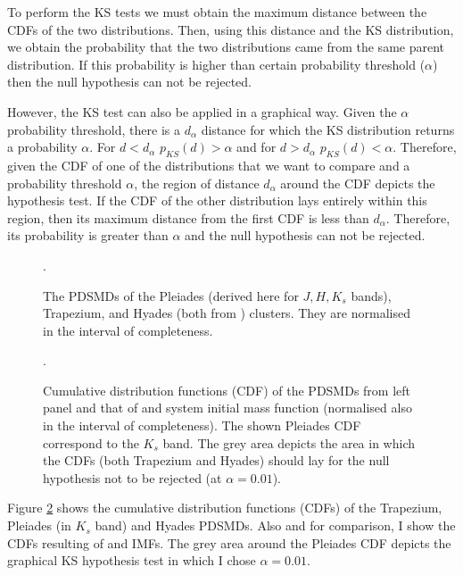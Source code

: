 To perform the KS tests we must obtain the maximum distance between the CDFs of the two distributions. Then, using this distance and the KS distribution, we obtain the probability that the two distributions came from the same parent distribution. If this probability is higher than certain probability threshold ($\alpha$) then the null hypothesis can not be rejected. 

However, the KS test can also be applied in a graphical way. Given the $\alpha$ probability threshold, there is a $d_{\alpha}$ distance for which the KS distribution returns a probability $\alpha$. For $d < d_{\alpha}$ $p_{KS}(d) > \alpha$ and for $d > d_{\alpha}$ $p_{KS}(d) < \alpha$. Therefore, given the CDF of one of the distributions that we want to compare and a probability threshold $\alpha$, the region of distance $d_{\alpha}$ around the CDF depicts the hypothesis test. If the CDF of the other distribution lays entirely within this region, then its maximum distance from the first CDF is less than $d_{\alpha}$. Therefore, its probability is greater than $\alpha$ and the null hypothesis can not be rejected.

\begin{figure}[htp]
\begin{center}
\caption{The PDSMDs of the Pleiades (derived here for $J,H,K_s$ bands), Trapezium, and Hyades (both from \citet{Bouy2015}) clusters. They are normalised in the interval of completeness.}
\label{fig:PDSMDcomparison}.
\end{center}
\end{figure}

\begin{figure}[htp]
\begin{center}
\caption{Cumulative distribution functions (CDF) of the PDSMDs from left panel and that of \citet{Chabrier2005} and \citet{Thies2007} system initial mass function (normalised also in the interval of completeness). The shown Pleiades CDF correspond to the $K_s$ band. The grey area depicts the area in which the CDFs (both Trapezium and Hyades) should lay for the null hypothesis not to be rejected (at $\alpha=0.01$).}
\label{fig:PDSMDtest}.
\end{center}
\end{figure}


Figure \ref{fig:PDSMDtest} shows the cumulative distribution functions (CDFs) of the Trapezium, Pleiades (in $K_s$ band) and Hyades PDSMDs. Also and for comparison, I show the CDFs resulting of \citet{Chabrier2005} and \citet{Thies2007} IMFs. The grey area around the Pleiades CDF depicts the graphical KS hypothesis test in which I chose $\alpha = 0.01$.

